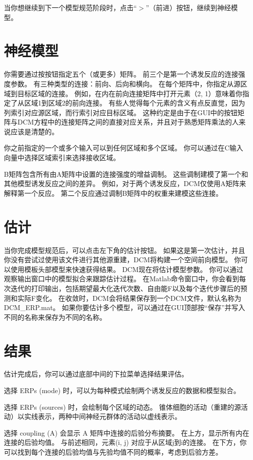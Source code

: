 当你想继续到下一个模型规范阶段时，点击“$>$”（前进）按钮，继续到神经模型。


\section{神经模型}

你需要通过按按钮指定五个（或更多）矩阵。
前三个是第一个诱发反应的连接强度参数。
有三种类型的连接：前向、后向和横向。
在每个矩阵中，你指定从源区域到目标区域的连接。
例如，在内在前向连接矩阵中打开元素（2, 1）意味着你指定了从区域1到区域2的前向连接。
有些人觉得每个元素的含义有点反直觉，因为列索引对应源区域，而行索引对应目标区域。
这种约定是由于在GUI中的按钮矩阵与DCM方程中的连接矩阵之间的直接对应关系，并且对于熟悉矩阵乘法的人来说应该是清楚的。

你之前指定的一个或多个输入可以到任何区域和多个区域。
你可以通过在C输入向量中选择区域索引来选择接收区域。

B矩阵包含所有由A矩阵中设置的连接强度的增益调制。
这些调制建模了第一个和其他模型诱发反应之间的差异。
例如，对于两个诱发反应，DCM仅使用A矩阵来解释第一个反应。
第二个反应通过调制B矩阵中的权重来建模这些连接。


\section{估计}

当你完成模型规范后，可以点击左下角的估计按钮。
如果这是第一次估计，并且你没有尝试过使用该文件进行其他源重建，DCM将构建一个空间前向模型。
你可以使用模板头部模型来快速获得结果。
DCM现在将估计模型参数。
你可以通过观察输出窗口中的模型拟合来跟踪估计过程。
在Matlab命令窗口中，你会看到每次迭代的打印输出，包括期望最大化迭代次数、自由能F以及每个迭代步骤后的预测和实际F变化。
在收敛时，DCM会将结果保存到一个DCM文件，默认名称为DCM\_ERP.mat。
如果你要估计多个模型，可以通过在GUI顶部按“保存”并写入不同的名称来保存为不同的名称。


\section{结果}

估计完成后，你可以通过底部中间的下拉菜单选择结果评估。

选择 ERPs (mode) 时，可以为每种模式绘制两个诱发反应的数据和模型拟合。

选择 ERPs (sources) 时，会绘制每个区域的动态。
锥体细胞的活动（重建的源活动）以实线表示，两种中间神经元群体的活动以虚线表示。

选择 coupling (A) 会显示 A 矩阵中连接的后验分布摘要。
在上方，显示所有内在连接的后验均值。
与前述相同，元素(i, j) 对应于从区域j到i的连接。
在下方，你可以找到每个连接的后验均值与先验均值不同的概率，考虑到后验方差。

